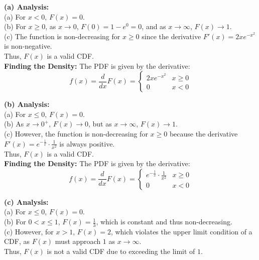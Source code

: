 \begin{solution}

\textbf{(a) Analysis:} \\

(a) For \( x < 0 \), \( F(x) = 0 \).\\
(b) For \( x \geq 0 \), as \( x \to 0 \), \( F(0) = 1 - e^{0} = 0 \), and as \( x \to \infty \), \( F(x) \to 1 \).\\
(c) The function is non-decreasing for \( x \geq 0 \) since the derivative \( F'(x) = 2x e^{-x^2} \) is non-negative.\\

Thus, \( F(x) \) is a valid CDF.\\

\textbf{Finding the Density:} The PDF is given by the derivative:
\[
f(x) = \frac{d}{dx}F(x) = 
\begin{cases} 
2x e^{-x^2} & x \geq 0 \\ 
0 & x < 0 
\end{cases}
\]

\textbf{(b) Analysis:} \\

(a) For \( x \leq 0 \), \( F(x) = 0 \).\\
(b) As \( x \to 0^+ \), \( F(x) \to 0 \), but as \( x \to \infty \), \( F(x) \to 1 \).\\
(c) However, the function is non-decreasing for \( x \geq 0 \) because the derivative \( F'(x) = e^{-\frac{1}{x}} \cdot \frac{1}{x^2} \) is always positive.\\

Thus, \( F(x) \) is a valid CDF.\\

\textbf{Finding the Density:} The PDF is given by the derivative:
\[
f(x) = \frac{d}{dx}F(x) = 
\begin{cases} 
    e^{-\frac{1}{x}} \cdot \frac{1}{x^2} & x \geq 0 \\ 
0 & x < 0 
\end{cases}
\]


\textbf{(c) Analysis:} \\

(a) For \( x \leq 0 \), \( F(x) = 0 \).\\
(b) For \( 0 < x \leq 1 \), \( F(x) = \frac{1}{3} \), which is constant and thus non-decreasing.\\
(c) However, for \( x > 1 \), \( F(x) = 2 \), which violates the upper limit condition of a CDF, as \( F(x) \) must approach \( 1 \) as \( x \to \infty \).\\

Thus, \( F(x) \) is not a valid CDF due to exceeding the limit of \( 1 \).\\


\end{solution}


